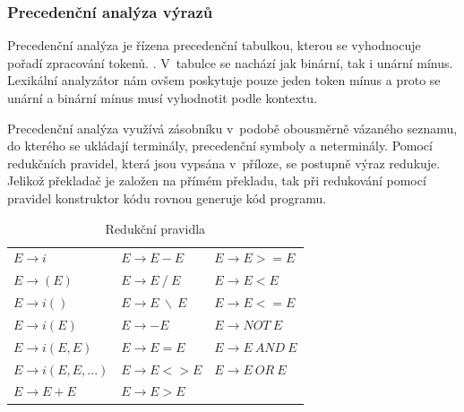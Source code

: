 \subsubsection{Precedenční analýza výrazů}

Precedenční analýza je řízena precedenční tabulkou, kterou se vyhodnocuje pořadí zpracování tokenů.
. V~tabulce se nachází jak binární, tak i unární mínus. Lexikální analyzátor nám ovšem poskytuje pouze jeden
token mínus a proto se unární a binární mínus musí vyhodnotit podle kontextu.

Precedenční analýza využívá zásobníku v~podobě obousměrně vázaného seznamu, do kterého se ukládají terminály,
precedenční symboly a neterminály. Pomocí redukčních pravidel, která jsou vypsána v~příloze, se postupně výraz redukuje.
Jelikož překladač je založen na přímém překladu, tak při redukování pomocí pravidel konstruktor kódu rovnou generuje kód
programu.


\begin{table}[!htbp]
    \centering
    \label{tabul:prav}
    \caption{Redukční pravidla}
    \begin{tabular}{lll}
        $E \to i$ & $E \to E - E$ & $E \to E >= E$\\
        $E \to (E)$ & $E \to E ~ / ~ E$ & $E \to E < E$\\
        $E \to i()$ & $E \to E ~ \backslash ~ E$ & $E \to E <= E$\\
        $E \to i(E)$ & $E \to - E$ & $E \to NOT ~ E$\\
        $E \to i(E, E)$ & $E \to E = E$ & $E \to E ~ AND ~ E$\\
        $E \to i(E, E, ...)$ & $E \to E <> E$ & $E \to E ~ OR ~ E$\\
        $E \to E + E$ & $E \to E > E$\\
    \end{tabular}
\end{table}

